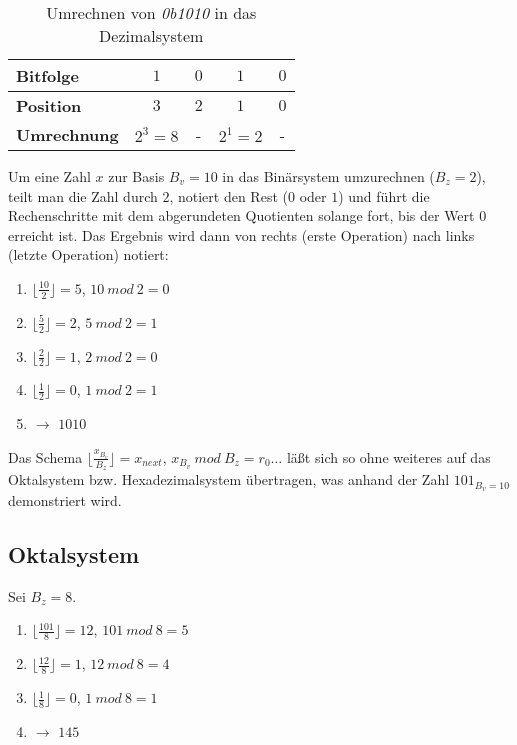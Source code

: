     {\renewcommand{\arraystretch}{2.5}%
\setlength{\tabcolsep}{12pt}%
\begin{table} %
    \begin{center}
        \begin{tabular}{|l | c | c |c |c |}
            \hline
            \textbf{Bitfolge} & $1$ & $0$ & $1$ & $0$  \\
            \hline
            \textbf{Position} & $3$ & $2$ & $1$ & $0$  \\
            \hline
            \textbf{Umrechnung} & $2^3 = 8$ & - & $2^1 = 2$ & - \\
            \hline
        \end{tabular}
        \caption{Umrechnen von \textit{0b1010} in das Dezimalsystem}
        \label{tab:bindec}
    \end{center}
\end{table}}

\noindent
Um eine Zahl $x$ zur Basis $B_v=10$ in das Binärsystem umzurechnen ($B_z =2$), teilt man die Zahl durch $2$, notiert den Rest ($0$ oder $1$) und führt die Rechenschritte mit dem abgerundeten Quotienten solange fort, bis der Wert $0$ erreicht ist.
Das Ergebnis wird dann von rechts (erste Operation) nach links (letzte Operation) notiert:

\begin{enumerate}
    \item $\lfloor \frac{10}{2} \rfloor = 5$,  $10\ mod\ 2 = 0$
    \item $\lfloor \frac{5}{2} \rfloor = 2$, $5\ mod\ 2 = 1$
    \item $\lfloor \frac{2}{2} \rfloor = 1$, $2\ mod\ 2 = 0$
    \item $\lfloor \frac{1}{2} \rfloor = 0$, $1\ mod\ 2 = 1$
    \item[] $\rightarrow$ $1010$
\end{enumerate}

\noindent
Das Schema $\lfloor \frac{x_{B_v}}{B_z} \rfloor = x_{next}$,  $x_{B_v}\ mod\ B_z = r_0 \ldots$ läßt sich so ohne weiteres auf das Oktalsystem bzw. Hexadezimalsystem übertragen, was anhand der Zahl $101_{B_v=10}$  demonstriert wird.

\subsection*{Oktalsystem}
Sei $B_z = 8$.\\

\begin{enumerate}
    \item $\lfloor \frac{101}{8} \rfloor = 12$,  $101\ mod\ 8 = 5$
    \item $\lfloor \frac{12}{8} \rfloor = 1$, $12\ mod\ 8 = 4$
    \item $\lfloor \frac{1}{8} \rfloor = 0$, $1\ mod\ 8 = 1$
    \item[] $\rightarrow$ $145$
\end{enumerate}\\


